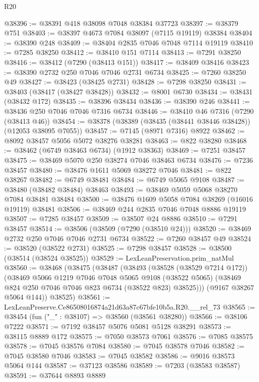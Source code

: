 \begin{lexlean}{R20}
\begin{coremodule}
{@38396 := @38391 @418 @38098 @7048 @38384 @37723
@38397 := @38379 @751
@38403 := @38397 @4673 @7084 @38097 (@7115 @19119) @38384
@38404 := @38390 @248
@38409 := @38404 @2835 @7046 @7048 @7114 @19119
@38410 := @7285 @38250
@38412 := @38410 @151 @7114
@38413 := @7291 @38250
@38416 := @38412 (@7290 (@38413 @151))
@38417 := @38409 @38416
@38423 := @38390 @2732 @250 @7046 @7046 @2731 @6734
@38425 := @7260 @38250 @49
@38427 := @38423 (@38425 @2731)
@38428 := @7298 @38250
@38431 := @38403 (@38417 (@38427 @38428))
@38432 := @8001 @6730
@38434 := @38431 (@38432 @172)
@38435 := @38396 @38434
@38436 := @38390 @246
@38441 := @38436 @250 @7046 @7046 @7316 @6734
@38446 := @38410 @46 @7316 (@7290 (@38413 @46))
@38454 := @38378 (@38389 (@38435 (@38441 @38446 @38428)) (@12053 @38095 @7055))
@38457 := @7145 (@8971 @7316) @8922
@38462 := @8092 @38457 @5056 @5072 @38276 @38281
@38463 := @822 @38280
@38468 := @38462 (@6749 @38463 @6734) (@1912 @38363)
@38469 := @7251 @38457
@38475 := @38469 @5070 @250 @38274 @7046 @38463 @6734
@38476 := @7236 @38457
@38480 := @38476 @1611 @5069 @38272 @7046
@38481 := @822 @38267
@38482 := @6749 @38481
@38484 := @6749 @5065 @9108
@38487 := @38480 (@38482 @38484) @38463
@38493 := @38469 @5059 @5068 @38270 @7084 @38481 @38484
@38500 := @38476 @1609 @5058 @7084 @38269 (@16016 @19119) @38481
@38506 := @38469 @244 @2835 @7046 @7048 @8886 @19119
@38507 := @7285 @38457
@38509 := @38507 @24 @8886
@38510 := @7291 @38457
@38514 := @38506 (@38509 (@7290 (@38510 @24)))
@38520 := @38469 @2732 @250 @7046 @7046 @2731 @6734
@38522 := @7260 @38457 @49
@38524 := @38520 (@38522 @2731)
@38525 := @7298 @38457
@38528 := @38500 (@38514 (@38524 @38525))
@38529 := LexLeanPreservation.prim_natMul
@38560 := @38468
    (@38475
      (@38487
        (@38493
          (@38528 (@38529 @7214 @172))
          (@38469
            @5066
            @1219
            @7046
            @7048
            @5065
            @9108
            (@38522 @5065)
            (@38469 @824 @250 @7046 @7046 @823 @6734 (@38522 @823) @38525)))
        (@9167 @38267 @5064 @144))
      @38525)
@38561 := LexLeanPreserve.Ce86508016874a21d63a87c67bfe10b5a.R20.__rel_73
@38565 := @38454 (fun ("_" : @38107) => @38560 (@38561 @38280))
@38566 := @38106 @7222
@38571 := @7192 @38457 @5076 @5081 @5128 @38291
@38573 := @38115 @8889 @172
@38575 := @7050 @38573 @7061
@38576 := @7085 @38575
@38578 := @7045 @38576 @7084
@38580 := @7045 @38578 @7046
@38582 := @7045 @38580 @7046
@38583 := @7045 @38582
@38586 := @9016 @38573 @5064 @144
@38587 := @37123 @38586
@38589 := @7203 (@38583 @38587)
@38591 := @37644 @8893 @8889
}
\end{coremodule}
\end{lexlean}
